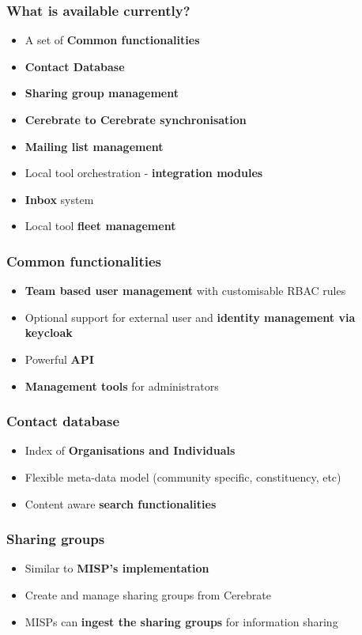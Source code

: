 \begin{frame}
	\frametitle{What is available currently?}
	\begin{itemize}
                \item A set of {\bf Common functionalities}
                \item {\bf Contact Database}
                \item {\bf Sharing group management}
                \item {\bf Cerebrate to Cerebrate synchronisation}
                \item {\bf Mailing list management}
                \item Local tool orchestration - {\bf integration modules}
                \item {\bf Inbox} system
                \item Local tool {\bf fleet management}
	\end{itemize}
\end{frame}

\begin{frame}
	\frametitle{Common functionalities}
	\begin{itemize}
                \item {\bf Team based user management} with customisable RBAC rules
                \item Optional support for external user and {\bf identity management via keycloak}
                \item Powerful {\bf API}
                \item {\bf Management tools} for administrators
	\end{itemize}
\end{frame}

\begin{frame}
	\frametitle{Contact database}
	\begin{itemize}
                \item Index of {\bf Organisations and Individuals}
                \item Flexible meta-data model (community specific, constituency, etc)
                \item Content aware {\bf search functionalities}
	\end{itemize}
\end{frame}

\begin{frame}
	\frametitle{Sharing groups}
	\begin{itemize}
                \item Similar to {\bf MISP's implementation}
                \item Create and manage sharing groups from Cerebrate
                \item MISPs can {\bf ingest the sharing groups} for information sharing
	\end{itemize}
\end{frame}


